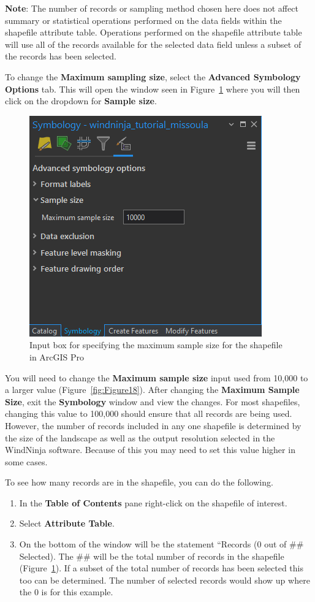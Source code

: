 \documentclass[12pt]{article}
\begin{document}
\textbf{Note}: The number of records or sampling method chosen here does not affect summary or statistical operations performed on the data fields within the shapefile attribute table. Operations performed on the shapefile attribute table will use all of the records available for the selected data field unless a subset of the records has been selected. 

To change the \textbf{Maximum sampling size}, select the \textbf{Advanced Symbology Options} tab. This will open the window seen in Figure~\ref{fig:Figure19} where you will then click on the dropdown for \textbf{Sample size}. 

\begin{figure}[H]
	\centering
	\includegraphics[scale=0.8]{arc_19.png}
	\caption{Input box for specifying the maximum sample size for the shapefile in ArcGIS Pro}
\label{fig:Figure19}
\end{figure}

You will need to change the \textbf{Maximum sample size} input used from 10,000 to a larger value (Figure~\ref{fig:Figure18}). After changing the \textbf{Maximum Sample Size}, exit the \textbf{Symbology} window and view the changes. For most shapefiles, changing this value to 100,000 should ensure that all records are being used. However, the number of records included in any one shapefile is determined by the size of the landscape as well as the output resolution selected in the WindNinja software. Because of this you may need to set this value higher in some cases.

To see how many records are in the shapefile, you can do the following.
\begin{enumerate}

\item In the \textbf{Table of Contents} pane right-click on the shapefile of interest.
\item  Select \textbf{Attribute Table}.
\item On the bottom of the window will be the statement “Records (0 out of \#\# Selected). The \#\# will be the total number of records in the shapefile (Figure~\ref{fig:Figure19}). If a subset of the total number of records has been selected this too can be determined. The number of selected records would show up where the 0 is for this example.
\end{enumerate}
\end{document}
